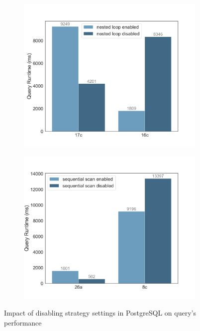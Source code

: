 \begin{figure}[H]
  \begin{subfigure}[t]{0.5\textwidth}
    \includegraphics[width=\textwidth]{img/solution/nested_loop_experiment.png}
    \label{fig-a}
  \end{subfigure}\hfill
  \begin{subfigure}[t]{0.5\textwidth}
    \includegraphics[width=\textwidth]{img/solution/sequential_scan_experiment.png}
    \label{fig-b}
  \end{subfigure}
  \caption{Impact of disabling strategy settings in PostgreSQL on query's performance} 
  \label{fig:preliminary_experiments}
\end{figure}

